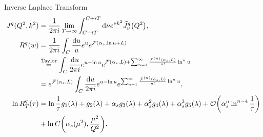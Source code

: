 \documentclass{beamer}
\begin{document}
\begin{frame}{Inverse Laplace Transform}
    \scriptsize
    \begin{align*}
        J^q(Q^2,k^2) &= \frac{1}{2\pi i} \lim_{T \to \infty}\int_{C-iT}^{C+iT} \dd \nu e^{\nu k^2} \tilde{J}^q_\nu \qty(Q^2),\\
        R^q(w) &= \frac{1}{2\pi i} \int_C \frac{\dd u}{u} e^{u} e^{\mathcal{F}(\alpha_s,\ln u + L)} \\
        &\stackrel{\text{Taylor}}{=} \int_C \frac{\dd u}{2\pi i} e^{u-\ln u} e^{\mathcal{F}(\alpha_s,L)+\sum_{n=1}^\infty \frac{\mathcal{F}^{(n)}(\alpha_s,L)}{n!}  \ln^n u}\\
        &= e^{\mathcal{F}(\alpha_s,L)} \int_C \frac{\dd u}{2\pi i} e^{u-\ln u} e^{\sum_{n=1}^\infty \frac{\mathcal{F}^{(n)}(\alpha_s,L)}{n!}  \ln^n u},\\
        \ln R_T^q(\tau) &= \ln \frac{1}{\tau} g_1(\lambda) + g_2(\lambda) + \alpha_s g_3(\lambda) + \alpha_s^2 g_4(\lambda) + \alpha_s^3 g_5(\lambda) + \order{\alpha_s^n \ln^{n-4}\frac{1}{\tau}} \nonumber\\
        &+ \ln C\qty(\alpha_s(\mu^2),\frac{\mu^2}{Q^2}).
    \end{align*}
\end{frame}

\backupend
\end{document}
